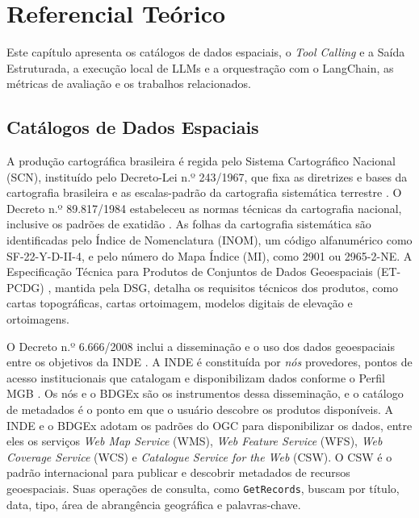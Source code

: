 \chapter{Referencial Teórico}
\label{cap:referencial}

Este capítulo apresenta os catálogos de dados espaciais, o \textit{Tool Calling} e a Saída Estruturada, a execução local de LLMs e a orquestração com o LangChain, as métricas de avaliação e os trabalhos relacionados.

\section{Catálogos de Dados Espaciais}

A produção cartográfica brasileira é regida pelo Sistema Cartográfico Nacional (SCN), instituído pelo Decreto-Lei n.º 243/1967, que fixa as diretrizes e bases da cartografia brasileira e as escalas-padrão da cartografia sistemática terrestre \cite{scn2016}. O Decreto n.º 89.817/1984 estabeleceu as normas técnicas da cartografia nacional, inclusive os padrões de exatidão \cite{brasil1984decreto}. As folhas da cartografia sistemática são identificadas pelo Índice de Nomenclatura (INOM), um código alfanumérico como \mbox{SF-22-Y-D-II-4}, e pelo número do Mapa Índice (MI), como 2901 ou \mbox{2965-2-NE}. A Especificação Técnica para Produtos de Conjuntos de Dados Geoespaciais (ET-PCDG) \cite{etpcdg2016}, mantida pela DSG, detalha os requisitos técnicos dos produtos, como cartas topográficas, cartas ortoimagem, modelos digitais de elevação e ortoimagens.

O Decreto n.º 6.666/2008 inclui a disseminação e o uso dos dados geoespaciais entre os objetivos da INDE \cite{inde2010decreto}. A INDE é constituída por \textit{nós} provedores, pontos de acesso institucionais que catalogam e disponibilizam dados conforme o Perfil MGB \cite{perfilmgb2009}. Os nós e o BDGEx são os instrumentos dessa disseminação, e o catálogo de metadados é o ponto em que o usuário descobre os produtos disponíveis. A INDE e o BDGEx adotam os padrões do OGC para disponibilizar os dados, entre eles os serviços \textit{Web Map Service} (WMS), \textit{Web Feature Service} (WFS), \textit{Web Coverage Service} (WCS) e \textit{Catalogue Service for the Web} (CSW). O CSW \cite{ogccsw2007} é o padrão internacional para publicar e descobrir metadados de recursos geoespaciais. Suas operações de consulta, como \texttt{GetRecords}, buscam por título, data, tipo, área de abrangência geográfica e palavras-chave.

